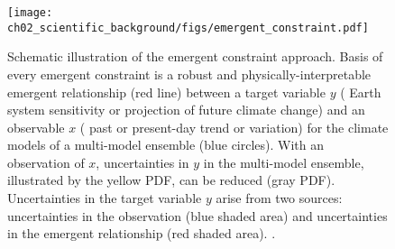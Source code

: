 \begin{figure}[t]
  \centering
  \texttt{[image: 
    ch02\_scientific\_background/figs/emergent\_constraint.pdf]}
  \caption[
    Schematic illustration of the emergent constraint approach.
  ]{
    Schematic illustration of the emergent constraint approach. Basis of every
    emergent constraint is a robust and physically-interpretable emergent
    relationship (red line) between a target variable $y$ (\eg{} Earth system
    sensitivity or projection of future climate change) and an observable $x$
    (\eg{} past or present-day trend or variation) for the climate models of a
    multi-model ensemble (blue circles). With an observation of $x$,
    uncertainties in $y$ in the multi-model ensemble, illustrated by the yellow
    \acf{PDF}, can be reduced (gray \acs{PDF}). Uncertainties in the target
    variable $y$ arise from two sources: uncertainties in the observation (blue
    shaded area) and uncertainties in the emergent relationship (red shaded
    area). .
  }
  \label{fig:02:emergent_constraint}
\end{figure}

